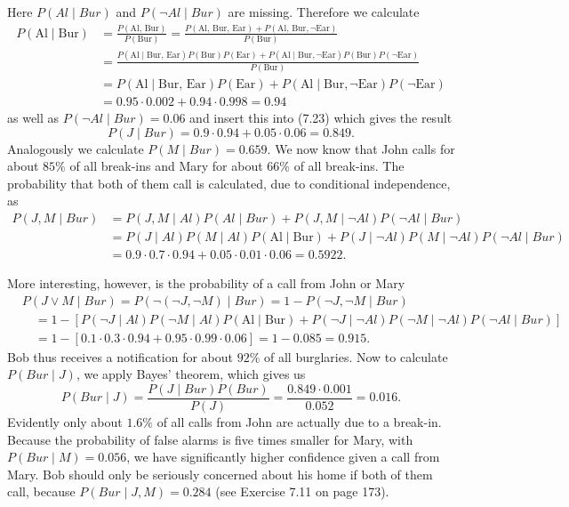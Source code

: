 \documentclass[10pt]{book}
\begin{document}
Here $P(Al \mid Bur)$ and $P(\neg Al \mid Bur)$ are missing. Therefore we calculate
$$
\begin{aligned}
P(\text{Al} \mid \text{Bur}) & =\frac{P(\text{Al, Bur})}{P(\text{Bur})}=\frac{P(\text{Al, Bur, Ear})+P(\text{Al, Bur}, \neg \text{Ear})}{P(\text{Bur})} \\
& =\frac{P(\text{Al} \mid \text{Bur, Ear}) P(\text{Bur}) P(\text{Ear})+P(\text{Al} \mid \text{Bur}, \neg \text{Ear}) P(\text{Bur}) P(\neg \text{Ear})}{P(\text{Bur})} \\
& =P(\text{Al} \mid \text{Bur, Ear}) P(\text{Ear})+P(\text{Al} \mid \text{Bur}, \neg \text{Ear}) P(\neg \text{Ear}) \\
& =0.95 \cdot 0.002+0.94 \cdot 0.998=0.94
\end{aligned}
$$
as well as $P(\neg Al \mid Bur)=0.06$ and insert this into (7.23) which gives the result
$$
P(J \mid Bur)=0.9 \cdot 0.94+0.05 \cdot 0.06=0.849 .
$$
Analogously we calculate $P(M \mid Bur)=0.659$. We now know that John calls for about $85 \%$ of all break-ins and Mary for about $66 \%$ of all break-ins. The probability that both of them call is calculated, due to conditional independence, as
$$
\begin{aligned}
P(J, M \mid Bur) & =P(J, M \mid Al) P(Al \mid Bur)+P(J, M \mid \neg Al) P(\neg Al \mid Bur) \\
& =P(J \mid Al) P(M \mid Al) P(\text{Al} \mid \text{Bur})+P(J \mid \neg Al) P(M \mid \neg Al) P(\neg Al \mid Bur) \\
& =0.9 \cdot 0.7 \cdot 0.94+0.05 \cdot 0.01 \cdot 0.06=0.5922 .
\end{aligned}
$$

More interesting, however, is the probability of a call from John or Mary
$$
\begin{aligned}
& P(J \vee M \mid Bur)=P(\neg(\neg J, \neg M) \mid Bur)=1-P(\neg J, \neg M \mid Bur) \\
& \quad=1-[P(\neg J \mid Al) P(\neg M \mid Al) P(\text{Al} \mid \text{Bur})+P(\neg J \mid \neg Al) P(\neg M \mid \neg Al) P(\neg Al \mid Bur)] \\
& \quad=1-[0.1 \cdot 0.3 \cdot 0.94+0.95 \cdot 0.99 \cdot 0.06]=1-0.085=0.915 .
\end{aligned}
$$
Bob thus receives a notification for about $92 \%$ of all burglaries. Now to calculate $P(Bur \mid J)$, we apply Bayes' theorem, which gives us
$$
P(Bur \mid J)=\frac{P(J \mid Bur) P(Bur)}{P(J)}=\frac{0.849 \cdot 0.001}{0.052}=0.016 .
$$
Evidently only about $1.6 \%$ of all calls from John are actually due to a break-in. Because the probability of false alarms is five times smaller for Mary, with $P(Bur \mid M)=0.056$, we have significantly higher confidence given a call from Mary. Bob should only be seriously concerned about his home if both of them call, because $P(Bur \mid J, M)=0.284$ (see Exercise 7.11 on page 173).
\end{document}
